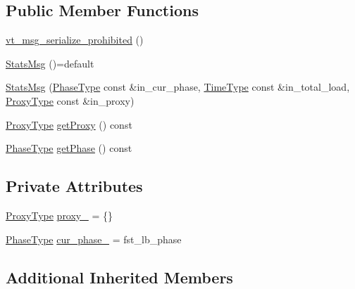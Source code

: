 \subsection*{Public Member Functions}
\begin{DoxyCompactItemize}
\item 
\hyperlink{structvt_1_1vrt_1_1collection_1_1balance_1_1_stats_msg_a3b71dc47eec1881fb243bf50e20f9a44}{vt\+\_\+msg\+\_\+serialize\+\_\+prohibited} ()
\item 
\hyperlink{structvt_1_1vrt_1_1collection_1_1balance_1_1_stats_msg_af801cc4ea278bc1d03ef87760cdb0ce4}{Stats\+Msg} ()=default
\item 
\hyperlink{structvt_1_1vrt_1_1collection_1_1balance_1_1_stats_msg_a0bab7add3b1971d1f2f0826128ab5a30}{Stats\+Msg} (\hyperlink{namespacevt_a46ce6733d5cdbd735d561b7b4029f6d7}{Phase\+Type} const \&in\+\_\+cur\+\_\+phase, \hyperlink{namespacevt_a876a9d0cd5a952859c72de8a46881442}{Time\+Type} const \&in\+\_\+total\+\_\+load, \hyperlink{structvt_1_1vrt_1_1collection_1_1balance_1_1_stats_msg_a6f88a58947e0a02b3f7dcfec8b91b5fd}{Proxy\+Type} const \&in\+\_\+proxy)
\item 
\hyperlink{structvt_1_1vrt_1_1collection_1_1balance_1_1_stats_msg_a6f88a58947e0a02b3f7dcfec8b91b5fd}{Proxy\+Type} \hyperlink{structvt_1_1vrt_1_1collection_1_1balance_1_1_stats_msg_ad6c41dfbee2143acc207716115023933}{get\+Proxy} () const
\item 
\hyperlink{namespacevt_a46ce6733d5cdbd735d561b7b4029f6d7}{Phase\+Type} \hyperlink{structvt_1_1vrt_1_1collection_1_1balance_1_1_stats_msg_a81328064a6ff12f8ae9629bdb400836e}{get\+Phase} () const
\end{DoxyCompactItemize}
\subsection*{Private Attributes}
\begin{DoxyCompactItemize}
\item 
\hyperlink{structvt_1_1vrt_1_1collection_1_1balance_1_1_stats_msg_a6f88a58947e0a02b3f7dcfec8b91b5fd}{Proxy\+Type} \hyperlink{structvt_1_1vrt_1_1collection_1_1balance_1_1_stats_msg_a0f43e643f46ea5392037528870d11ae2}{proxy\+\_\+} = \{\}
\item 
\hyperlink{namespacevt_a46ce6733d5cdbd735d561b7b4029f6d7}{Phase\+Type} \hyperlink{structvt_1_1vrt_1_1collection_1_1balance_1_1_stats_msg_a1d43d67f8161a18a2b0c146ddb777819}{cur\+\_\+phase\+\_\+} = fst\+\_\+lb\+\_\+phase
\end{DoxyCompactItemize}
\subsection*{Additional Inherited Members}



